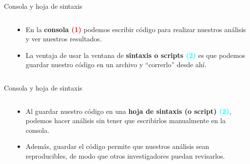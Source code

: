 \documentclass[
  13pt,
  ignorenonframetext,
]{beamer}
\begin{document}
\begin{frame}{Consola y hoja de sintaxis}
\label{consola-y-hoja-de-sintaxis}
\begin{columns}[t]
    \begin{column}{.65\textwidth}
    \end{column}
    \begin{column}{.5\textwidth}
      \begin{itemize}
        \item En la \textbf{consola \textcolor{red}{(1)}} podemos escribir código para realizar nuestros análisis y ver nuestros resultados.
        \item La ventaja de usar la ventana de \textbf{sintaxis o scripts \textcolor{cyan}{(2)}} es que podemos guardar nuestro código en un archivo y ``correrlo'' desde ahí.
      \end{itemize}
    \end{column}
  \end{columns}
\end{frame}

\begin{frame}{Consola y hoja de sintaxis}
\label{consola-y-hoja-de-sintaxis-1}
\begin{columns}[t]
    \begin{column}{.65\textwidth}
    \end{column}
    \begin{column}{.5\textwidth}
      \begin{itemize}
        \item Al guardar nuestro código en una \textbf{hoja de sintaxis (o script) \textcolor{cyan}{(2)}}, podemos hacer análisis sin tener que escribirlos manualmente en la consola.
        \item Además, guardar el código permite que nuestros análisis sean reproducibles, de modo que otros investigadores puedan revisarlos.
      \end{itemize}
    \end{column}
  \end{columns}
\end{frame}
\end{document}
